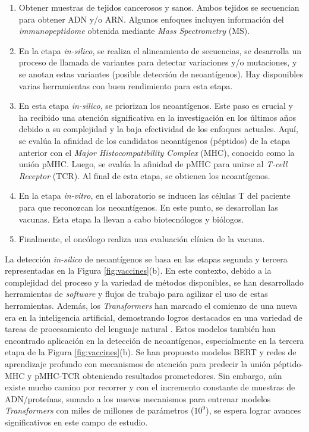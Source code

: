 \begin{enumerate}
	\item Obtener muestras de tejidos cancerosos y sanos. Ambos tejidos se secuencian para obtener ADN y/o ARN. Algunos enfoques incluyen información del \textit{immunopeptidome} obtenida mediante \textit{Mass Spectrometry} (MS).
	\item En la etapa \textit{in-silico}, se realiza el alineamiento de secuencias, se desarrolla un proceso de llamada de variantes para detectar variaciones y/o mutaciones, y se anotan estas variantes (posible detección de neoantígenos). Hay disponibles varias herramientas con buen rendimiento para esta etapa.
	\item En esta etapa \textit{in-silico}, se priorizan los neoantígenos. Este paso es crucial y ha recibido una atención significativa en la investigación en los últimos años debido a su complejidad y la baja efectividad de los enfoques actuales. Aquí, se evalúa la afinidad de los candidatos neoantígenos (péptidos) de la etapa anterior con el \textit{Major Histocompatibility Complex} (MHC), conocido como la unión pMHC. Luego, se evalúa la afinidad de pMHC para unirse al \textit{T-cell Receptor} (TCR). Al final de esta etapa, se obtienen los neoantígenos.
	\item En la etapa \textit{in-vitro}, en el laboratorio se inducen las células T del paciente para que reconozcan los neoantígenos. En este punto, se desarrollan las vacunas. Esta etapa la llevan a cabo biotecnólogos y biólogos.
	\item Finalmente, el oncólogo realiza una evaluación clínica de la vacuna.
	
\end{enumerate}

La detección \textit{in-silico} de neoantígenos se basa en las etapas segunda y tercera representadas en la Figura \ref{fig:vaccines}(b). En este contexto, debido a la complejidad del proceso y la variedad de métodos disponibles, se han desarrollado herramientas de \textit{software} y flujos de trabajo para agilizar el uso de estas herramientas. Además, los \textit{Transformers} han marcado el comienzo de una nueva era en la inteligencia artificial, demostrando logros destacados en una variedad de tareas de procesamiento del lenguaje natural  \citep{patwardhan2023transformers}. Estos modelos también han encontrado aplicación en la detección de neoantígenos, especialmente en la tercera etapa de la Figura \ref{fig:vaccines}(b). Se han propuesto modelos BERT y redes de aprendizaje profundo con mecanismos de atención para predecir la unión péptido-MHC y pMHC-TCR obteniendo resultados prometedores. Sin embargo, aún existe mucho camino por recorrer y con el incremento constante de muestras de ADN/proteínas, sumado a los nuevos mecanismos para entrenar modelos \textit{Transformers} con miles de millones de parámetros ($10^9$), se espera lograr avances significativos en este campo de estudio.



